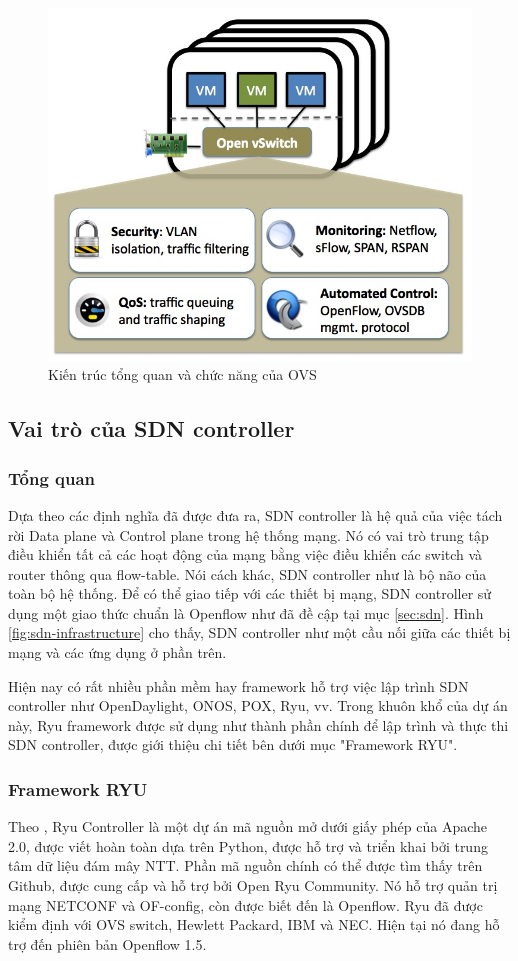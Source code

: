 \begin{figure}[ht!]
	\centering
	\includegraphics[width=0.5\linewidth]{fig/ovs.png}
	\caption{Kiến trúc tổng quan và chức năng của OVS \cite{16-openvswitch}}
	\label{fig:ovs}
\end{figure}

\subsection{Vai trò của SDN controller}

\subsubsection{Tổng quan}

Dựa theo các định nghĩa đã được đưa ra, SDN controller là hệ quả của việc tách rời Data plane và Control plane trong hệ thống mạng. Nó có vai trò trung tập điều khiển tất cả các hoạt động của mạng bằng việc điều khiển các switch và router thông qua flow-table. Nói cách khác, SDN controller như là bộ não của toàn bộ hệ thống. Để có thể giao tiếp với các thiết bị mạng, SDN controller sử dụng một giao thức chuẩn là Openflow như đã đề cập tại mục \ref{sec:sdn}. Hình \ref{fig:sdn-infrastructure} cho thấy, SDN controller như một cầu nối giữa các thiết bị mạng và các ứng dụng ở phần trên.

Hiện nay có rất nhiều phần mềm hay framework hỗ trợ việc lập trình SDN controller như OpenDaylight, ONOS, POX, Ryu, vv. Trong khuôn khổ của dự án này, Ryu framework được sử dụng như thành phần chính để lập trình và thực thi SDN controller, được giới thiệu chi tiết bên dưới mục "Framework RYU".

\subsubsection{Framework RYU}
\label{sec:ryu}

Theo \cite{17-Asadollahi}, Ryu Controller là một dự án mã nguồn mở dưới giấy phép của Apache 2.0, được viết hoàn toàn dựa trên Python, được hỗ trợ và triển khai bởi trung tâm dữ liệu đám mây NTT. Phần mã nguồn chính có thể được tìm thấy trên Github, được cung cấp và hỗ trợ bởi Open Ryu Community. Nó hỗ trợ quản trị mạng NETCONF và OF-config, còn được biết đến là Openflow. Ryu đã được kiểm định với OVS switch, Hewlett Packard, IBM và NEC. Hiện tại nó đang hỗ trợ đến phiên bản Openflow 1.5.

